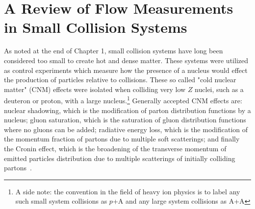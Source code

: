 \section{A Review of Flow Measurements in Small Collision Systems}
As noted at the end of Chapter 1, small collision systems have long been considered too small to create hot and dense matter. These systems were utilized as control experiments which measure how the presence of a nucleus would effect the production of particles relative to \pp collisions. These so called "cold nuclear matter" (CNM) effects were isolated when colliding very low $Z$ nuclei, such as a deuteron or proton, with a large nucleus.\footnote{ A side note: the convention in the field of heavy ion physics is to label any such small system collisions as $p$+A and any large system collisions as A+A} Generally accepted CNM effects are: nuclear shadowing, which is the modification of parton distribution functions by a nucleus; gluon saturation, which is the saturation of gluon distribution functions where no gluons can be added; radiative energy loss, which is the modification of the momentum fraction of partons due to multiple soft scatterings; and finally the Cronin effect, which is the broadening of the transverse momentum of emitted particles distribution due to multiple scatterings of initially colliding partons~\cite{Frawley:2012hv}.

